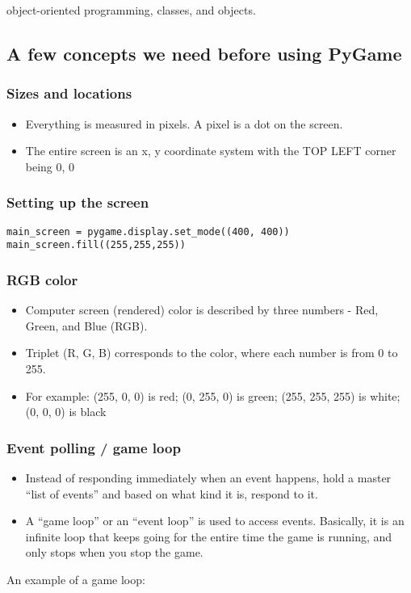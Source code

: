 \documentclass[letterpaper,10pt,english]{/usr/local/lib/python2.7/dist-packages/sphinx/texinputs/sphinxhowto}
\begin{document}
object-oriented programming, classes, and objects.\subsection{A few concepts we need before using PyGame}\subsubsection{Sizes and locations}\begin{itemize}
\item
  Everything is measured in pixels. A pixel is a dot on the screen.
\item
  The entire screen is an x, y coordinate system with the TOP LEFT
  corner being 0, 0
\end{itemize}\subsubsection{Setting up the screen}\begin{verbatim}
main_screen = pygame.display.set_mode((400, 400))
main_screen.fill((255,255,255))
\end{verbatim}\subsubsection{RGB color}\begin{itemize}
\item
  Computer screen (rendered) color is described by three numbers - Red,
  Green, and Blue (RGB).
\item
  Triplet (R, G, B) corresponds to the color, where each number is from
  0 to 255.
\item
  For example: (255, 0, 0) is red; (0, 255, 0) is green; (255, 255, 255)
  is white; (0, 0, 0) is black
\end{itemize}\subsubsection{Event polling / game loop}\begin{itemize}
\item
  Instead of responding immediately when an event happens, hold a master
  ``list of events'' and based on what kind it is, respond to it.
\item
  A ``game loop'' or an ``event loop'' is used to access events.
  Basically, it is an infinite loop that keeps going for the entire time
  the game is running, and only stops when you stop the game.
\end{itemize}An example of a game loop:
\end{document}
